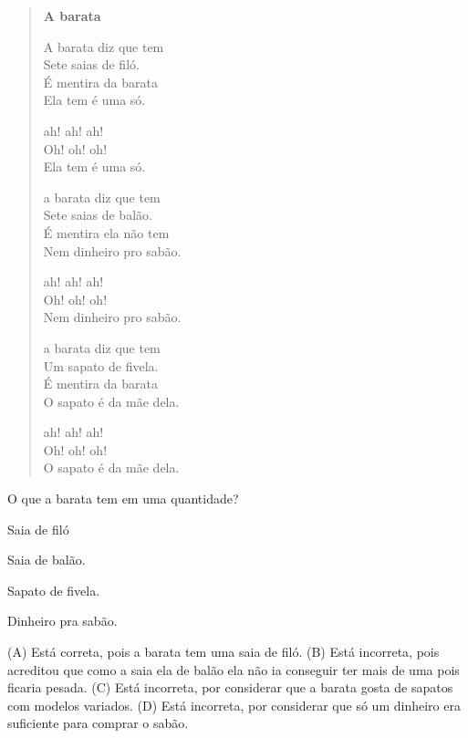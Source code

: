 \begin{verse}
\textbf{A barata}

A barata diz que tem\\
Sete saias de filó.\\
É mentira da barata\\
Ela tem é uma só.

ah! ah! ah!\\
Oh! oh! oh!\\
Ela tem é uma só.

a barata diz que tem\\
Sete saias de balão.\\
É mentira ela não tem\\
Nem dinheiro pro sabão.

ah! ah! ah!\\
Oh! oh! oh!\\
Nem dinheiro pro sabão.

a barata diz que tem\\
Um sapato de fivela.\\
É mentira da barata\\
O sapato é da mãe dela.

ah! ah! ah!\\
Oh! oh! oh!\\
O sapato é da mãe dela.
\end{verse}


O que a barata tem em uma quantidade?

\begin{escolha}
\item Saia de filó

\item Saia de balão.

\item Sapato de fivela.

\item Dinheiro pra sabão.
\end{escolha}


(A) Está correta, pois a barata tem uma saia de filó.
(B) Está incorreta, pois acreditou que como a saia ela de balão ela não
ia conseguir ter mais de uma pois ficaria pesada.
(C) Está incorreta, por considerar que a barata gosta de sapatos com
modelos variados.
(D) Está incorreta, por considerar que só um dinheiro era suficiente
para comprar o sabão.

